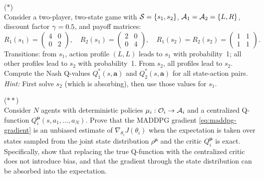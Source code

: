 \documentclass[11pt,a4paper]{article}
\begin{document}
\begin{exercise}
\textnormal{(\(*\))} \\
Consider a two-player, two-state game with $\mathcal{S} = \{s_1, s_2\}$,
$\mathcal{A}_1 = \mathcal{A}_2 = \{L, R\}$, discount factor $\gamma = 0.5$,
and payoff matrices:
\[
  R_1(s_1) = \begin{pmatrix} 4 & 0 \\ 0 & 2 \end{pmatrix}, \quad
  R_2(s_1) = \begin{pmatrix} 2 & 0 \\ 0 & 4 \end{pmatrix}, \quad
  R_1(s_2) = R_2(s_2) = \begin{pmatrix} 1 & 1 \\ 1 & 1 \end{pmatrix}.
\]
Transitions: from $s_1$, action profile $(L,L)$ leads to $s_1$ with
probability~1; all other profiles lead to $s_2$ with probability~1.
From $s_2$, all profiles lead to $s_2$.  Compute the Nash Q-values
$Q_1^*(s, \mathbf{a})$ and $Q_2^*(s, \mathbf{a})$ for all state-action
pairs.  \textit{Hint:} First solve $s_2$ (which is absorbing), then
use those values for $s_1$.
\end{exercise}

\begin{exercise}
\textnormal{(\(**\))} \\
Consider $N$ agents with deterministic policies
$\mu_i : \mathcal{O}_i \to \mathcal{A}_i$ and a centralized Q-function
$Q_i^{\boldsymbol{\mu}}(s, a_1, \ldots, a_N)$.  Prove that the MADDPG
gradient \eqref{eq:maddpg-gradient} is an unbiased estimate of
$\nabla_{\theta_i} J(\theta_i)$ when the expectation is taken over
states sampled from the joint state distribution
$\rho^{\boldsymbol{\mu}}$ and the critic $Q_i^{\boldsymbol{\mu}}$ is
exact.  Specifically, show that replacing the true Q-function with the
centralized critic does not introduce bias, and that the gradient through
the state distribution can be absorbed into the expectation.
\end{exercise}
\end{document}
